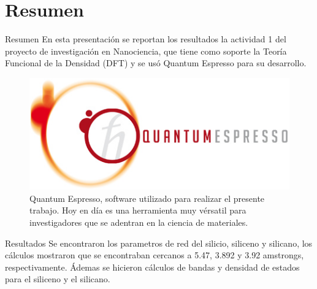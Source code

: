 
\section{Resumen}

\begin{frame}{Resumen}
    En esta presentación se reportan los resultados la actividad 1 del proyecto de investigación en 
    Nanociencia, que tiene como soporte la Teoría Funcional de la Densidad (DFT) y se usó Quantum
    Espresso para su desarrollo.

    \vspace{0.5cm}

    \begin{figure}[H]
        \centering
        \includegraphics[scale=0.45]{logo_header.jpg}
        \caption{Quantum Espresso, software utilizado para realizar el presente trabajo. Hoy en día 
                 es una herramienta muy vérsatil para investigadores que se adentran en la ciencia 
                 de materiales.}
    \end{figure}
\end{frame}

\begin{frame}
    \begin{block}{Resultados}
        Se encontraron los parametros de red del silicio, siliceno y silicano, los cálculos mostraron
        que se encontraban cercanos a 5.47, 3.892 y 3.92 amstrongs, respectivamente. 
        Ádemas se hicieron cálculos de bandas y densidad de estados para el siliceno y el silicano.
    \end{block}
\end{frame}



